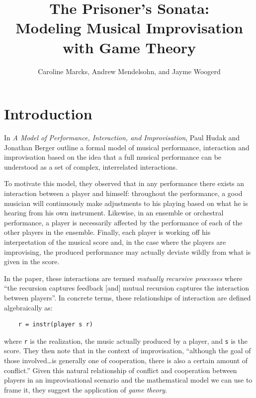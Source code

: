 \documentclass{article}
\begin{document}
\title{The Prisoner's Sonata: \\ \large Modeling Musical Improvisation with Game Theory}
\date{}
\author{Caroline Marcks, Andrew Mendelsohn, and Jayme Woogerd}
\maketitle


\section{Introduction}

In \emph{A Model of Performance, Interaction, and Improvisation}\cite{hudakberger95}, Paul
Hudak and Jonathan Berger outline a formal model of musical performance, interaction and
improvisation based on the idea that a full musical performance can be
understood as a set of complex, interrelated interactions.

To motivate this model, they observed that in any performance there exists
an interaction between a player and himself: throughout the performance,
a good musician will continuously make adjustments to his playing based
on what he is hearing from his own instrument. Likewise, in an ensemble
or orchestral performance, a player is necessarily affected by the
performance of each of the other players in the ensemble. Finally, each
player is working off his interpretation of the musical score
and, in the case where the players are improvising, the produced
performance may actually deviate wildly from what is given in the score.

In the paper, these interactions are termed \emph{mutually recursive
processes} where ``the recursion captures feedback {[}and{]} mutual
recursion captures the interaction between players''.\cite{hudakberger95} In
concrete terms, these relationships of interaction are defined
algebraically as:

\begin{verbatim}
    r = instr(player s r)
\end{verbatim}


where \texttt{r} is the realization, the music actually produced by a
player, and \texttt{s} is the score.  They then note that in the
context of improvisation, ``although the goal of those involved\ldots{}is generally one of cooperation, there is also a certain amount of
conflict.''\cite{hudakberger95}  Given this natural relationship of conflict and cooperation
between players in an improvisational scenario and the mathematical
model we can use to frame it, they suggest the application of \emph{game
theory}.
\end{document}
